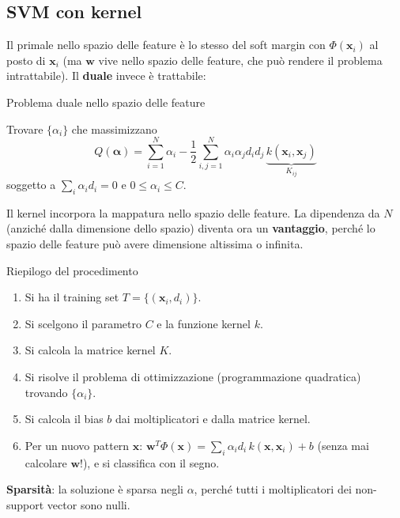 \subsection{SVM con kernel}\label{svm-con-kernel}

Il primale nello spazio delle feature è lo stesso del soft margin con
\(\Phi(\mathbf{x}_i)\) al posto di \(\mathbf{x}_i\) (ma \(\mathbf{w}\)
vive nello spazio delle feature, che può rendere il problema
intrattabile). Il \textbf{duale} invece è trattabile:

\begin{boxdefinition}{Problema duale nello spazio delle feature}

Trovare \(\{\alpha_i\}\) che massimizzano \[
Q(\boldsymbol{\alpha}) = \sum_{i=1}^{N}\alpha_i - \frac{1}{2}\sum_{i,j=1}^{N}\alpha_i\alpha_j d_i d_j\,\underbrace{k(\mathbf{x}_i, \mathbf{x}_j)}_{K_{ij}}
\] soggetto a \(\sum_i\alpha_i d_i = 0\) e \(0 \le \alpha_i \le C\).

\end{boxdefinition}

Il kernel incorpora la mappatura nello spazio delle feature. La
dipendenza da \(N\) (anziché dalla dimensione dello spazio) diventa ora
un \textbf{vantaggio}, perché lo spazio delle feature può avere
dimensione altissima o infinita.

\begin{boxabstract}{Riepilogo del procedimento}

\begin{enumerate}
\def\labelenumi{\arabic{enumi}.}
\tightlist
\item
  Si ha il training set \(T = \{(\mathbf{x}_i, d_i)\}\).
\item
  Si scelgono il parametro \(C\) e la funzione kernel \(k\).
\item
  Si calcola la matrice kernel \(K\).
\item
  Si risolve il problema di ottimizzazione (programmazione quadratica)
  trovando \(\{\alpha_i\}\).
\item
  Si calcola il bias \(b\) dai moltiplicatori e dalla matrice kernel.
\item
  Per un nuovo pattern \(\mathbf{x}\):
  \(\mathbf{w}^T\Phi(\mathbf{x}) = \sum_i\alpha_i d_i\,k(\mathbf{x}, \mathbf{x}_i) + b\)
  (senza mai calcolare \(\mathbf{w}\)!), e si classifica con il segno.
\end{enumerate}

\textbf{Sparsità}: la soluzione è sparsa negli \(\alpha\), perché tutti
i moltiplicatori dei non-support vector sono nulli.

\end{boxabstract}

